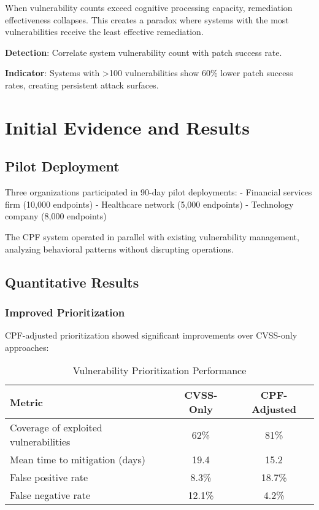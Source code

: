 \documentclass[11pt,a4paper]{article}
\begin{document}
When vulnerability counts exceed cognitive processing capacity, remediation effectiveness collapses. This creates a paradox where systems with the most vulnerabilities receive the least effective remediation.

\textbf{Detection}: Correlate system vulnerability count with patch success rate.

\textbf{Indicator}: Systems with >100 vulnerabilities show 60\% lower patch success rates, creating persistent attack surfaces.

\section{Initial Evidence and Results}

\subsection{Pilot Deployment}

Three organizations participated in 90-day pilot deployments:
- Financial services firm (10,000 endpoints)
- Healthcare network (5,000 endpoints)
- Technology company (8,000 endpoints)

The CPF system operated in parallel with existing vulnerability management, analyzing behavioral patterns without disrupting operations.

\subsection{Quantitative Results}

\subsubsection{Improved Prioritization}

CPF-adjusted prioritization showed significant improvements over CVSS-only approaches:

\begin{table}[h!]
\centering
\caption{Vulnerability Prioritization Performance}
\label{tab:performance}
\begin{tabular}{lcc}
\toprule
Metric & CVSS-Only & CPF-Adjusted \\
\midrule
Coverage of exploited vulnerabilities & 62\% & 81\% \\
Mean time to mitigation (days) & 19.4 & 15.2 \\
False positive rate & 8.3\% & 18.7\% \\
False negative rate & 12.1\% & 4.2\% \\
\bottomrule
\end{tabular}
\end{table}
\end{document}
